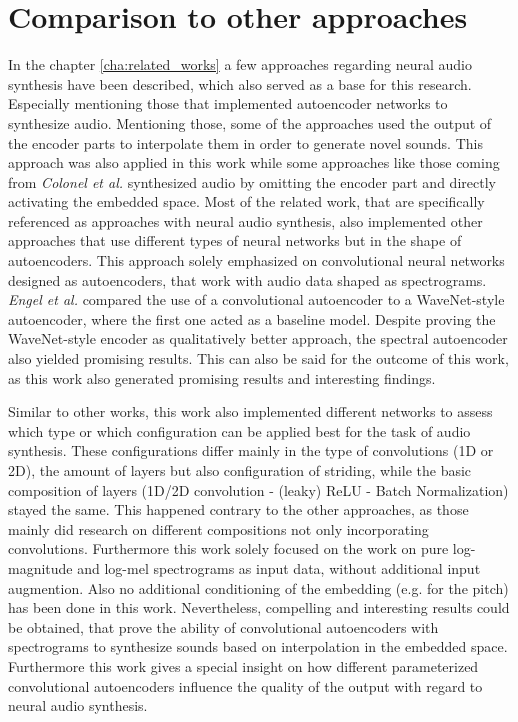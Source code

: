 \section{Comparison to other approaches}
In the chapter \ref{cha:related_works} a few approaches regarding neural audio synthesis have been described, which also served as a base for this research. Especially mentioning those that implemented autoencoder networks to synthesize audio. Mentioning those, some of the approaches used the output of the encoder parts to interpolate them in order to generate novel sounds. This approach was also applied in this work while some approaches like those coming from \textit{Colonel et al.} synthesized audio by omitting the encoder part and directly activating the embedded space. Most of the related work, that are specifically referenced as approaches with neural audio synthesis, also implemented other approaches that use different types of neural networks but in the shape of autoencoders. This approach solely emphasized on convolutional neural networks designed as autoencoders, that work with audio data shaped as spectrograms. \textit{Engel et al.} compared the use of a convolutional autoencoder to a WaveNet-style autoencoder, where the first one acted as a baseline model. Despite proving the WaveNet-style encoder as qualitatively better approach, the spectral autoencoder also yielded promising results. This can also be said for the outcome of this work, as this work also generated promising results and interesting findings.

Similar to other works, this work also implemented different networks to assess which type or which configuration can be applied best for the task of audio synthesis. These configurations differ mainly in the type of convolutions (1D or 2D), the amount of layers but also configuration of striding, while the basic composition of layers (1D/2D convolution - (leaky) ReLU - Batch Normalization) stayed the same. This happened contrary to the other approaches, as those mainly did research on different compositions not only incorporating convolutions. Furthermore this work solely focused on the work on pure log-magnitude and log-mel spectrograms as input data, without additional input augmention. Also no additional conditioning of the embedding (e.g. for the pitch) has been done in this work. Nevertheless, compelling and interesting results could be obtained, that prove the ability of convolutional autoencoders with spectrograms to synthesize sounds based on interpolation in the embedded space. Furthermore this work gives a special insight on how different parameterized convolutional autoencoders influence the quality of the output with regard to neural audio synthesis.



